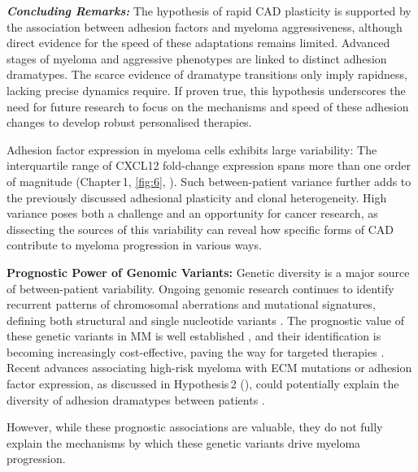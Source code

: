 \textbf{\textit{Concluding Remarks:}} The hypothesis of rapid \ac{CAD}
plasticity is supported by the association between adhesion factors and myeloma
aggressiveness, although direct evidence for the speed of these adaptations
remains limited. Advanced stages of myeloma and aggressive phenotypes are linked
to distinct adhesion dramatypes. The scarce evidence of dramatype transitions
only imply rapidness, lacking precise dynamics require. If proven true, this
hypothesis underscores the need for future research to focus on the mechanisms
and speed of these adhesion changes to develop robust personalised therapies.




\unnsubsection{\cadddiversitytitle}%
\label{sec:discussion_cadddiversity}%
Adhesion factor expression in myeloma cells exhibits large variability: The
interquartile range of CXCL12 fold-change expression spans more than one order
of magnitude (Chapter\,1, \autoref{fig:6}, ). Such
between-patient variance further adds to the previously discussed adhesional
plasticity and clonal heterogeneity. High
variance poses both a challenge and an opportunity for cancer research, as
dissecting the sources of this variability can reveal how specific forms
of \ac{CAD} contribute to myeloma progression in various ways.


\textbf{Prognostic Power of Genomic Variants:}
Genetic diversity is a major source of between-patient variability. Ongoing
genomic research continues to identify recurrent patterns of chromosomal
aberrations and mutational signatures, defining both structural and single
nucleotide variants \cite{kumarMultipleMyelomasCurrent2018a,
      hoangMutationalProcessesContributing2019}. The prognostic value of these genetic
variants in MM is well established \cite{sharmaPrognosticRoleMYC2021}, and their
identification is becoming increasingly cost-effective, paving the way for
targeted therapies \cite{zouComprehensiveApproachEvaluate2024,
      budurleanIntegratingOpticalGenome2024}. Recent advances associating high-risk
myeloma with \ac{ECM} mutations or adhesion factor expression, as discussed in
Hypothesis\,2 (), could potentially
explain the diversity of adhesion dramatypes between patients
\cite{eversPrognosticValueExtracellular2023,
      huDevelopmentCellAdhesionbased2024}.

However, while these prognostic associations are valuable, they do not fully
explain the mechanisms by which these genetic variants drive myeloma
progression.



